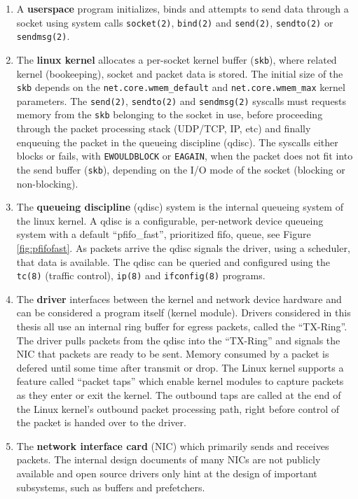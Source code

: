 \begin{enumerate}
    
    \item A \textbf{userspace} program initializes, binds and attempts to send
    data through a socket using system calls \texttt{socket(2)}, \texttt{bind(2)} 
    and \texttt{send(2)}, \texttt{sendto(2)} or \texttt{sendmsg(2)}.

    \item The \textbf{linux kernel} allocates a per-socket kernel buffer (\texttt{skb}), 
    where related kernel (bookeeping), socket and packet data is stored. The initial
    size of the \texttt{skb} depends on the \texttt{net.core.wmem\_default} and 
    \texttt{net.core.wmem\_max} kernel parameters. The \texttt{send(2)}, \texttt{sendto(2)} and 
    \texttt{sendmsg(2)} syscalls must requests memory from the \texttt{skb} belonging to the 
    socket in use, before proceeding through the packet processing stack (UDP/TCP, IP, etc) 
    and finally enqueuing the packet in the queueing discipline (qdisc). The syscalls
    either blocks or fails, with \texttt{EWOULDBLOCK} or \texttt{EAGAIN}, when the 
    packet does not fit into the send buffer (\texttt{skb}), depending on the I/O 
    mode of the socket (blocking or non-blocking).

    \item The \textbf{queueing discipline} (qdisc) system is the internal queueing system 
    of the linux kernel. A qdisc is a configurable, per-network device queueing system with a 
    default ``pfifo\_fast'', prioritized fifo, queue, see Figure \ref{fig:pfifofast}. As 
    packets arrive the qdisc signals the driver, using a scheduler, that data is available. 
    The qdisc can be queried and configured using the \texttt{tc(8)} (traffic control),
    \texttt{ip(8)} and \texttt{ifconfig(8)} programs. 

    \item The \textbf{driver} interfaces between the kernel and network device hardware and
    can be considered a program itself (kernel module). Drivers considered in this thesis
    all use an internal ring buffer for egress packets, called the ``TX-Ring''. The driver
    pulls packets from the qdisc into the ``TX-Ring'' and signals the NIC that packets are
    ready to be sent. Memory consumed by a packet is defered until some time after transmit
    or drop. The Linux kernel supports a feature called ``packet taps'' which enable kernel
    modules to capture packets as they enter or exit the kernel. The outbound taps are called 
    at the end of the Linux kernel's outbound packet processing path, right before control of 
    the packet is handed over to the driver.

    \item The \textbf{network interface card} (NIC) which primarily sends and receives packets. 
    The internal design documents of many NICs are not publicly available and open source
    drivers only hint at the design of important subsystems, such as buffers and prefetchers. 

\end{enumerate}

